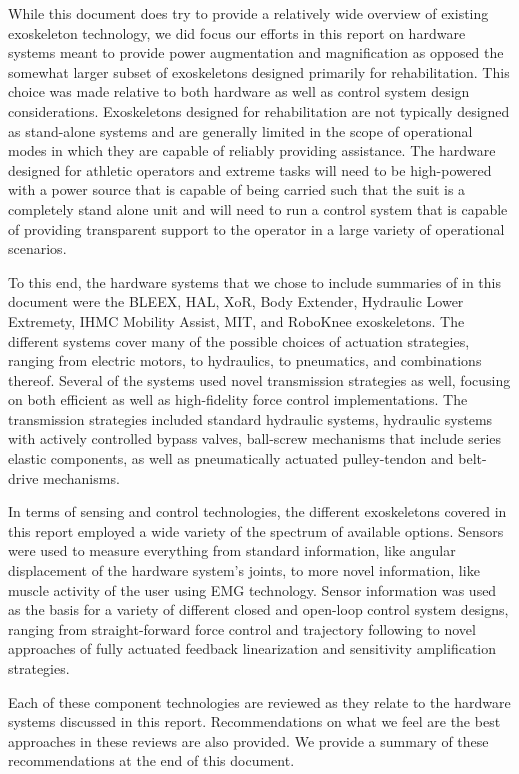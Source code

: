 \documentclass[letterpaper,12pt,fullpage]{article}
\begin{document}
While this document does try to provide a relatively wide overview of existing exoskeleton technology, we did focus our efforts in this report on hardware systems meant to provide power augmentation and magnification as opposed the somewhat larger subset of exoskeletons designed primarily for rehabilitation.  This choice was made relative to both hardware as well as control system design considerations.  Exoskeletons designed for rehabilitation are not typically designed as stand-alone systems and are generally limited in the scope of operational modes in which they are capable of reliably providing assistance.  The hardware designed for athletic operators and extreme tasks will need to be high-powered with a power source that is capable of being carried such that the suit is a completely stand alone unit and will need to run a control system that is capable of providing transparent support to the operator in a large variety of operational scenarios.

To this end, the hardware systems that we chose to include summaries of in this document were the BLEEX, HAL, XoR, Body Extender, Hydraulic Lower Extremety, IHMC Mobility Assist, MIT, and RoboKnee exoskeletons.  The different systems cover many of the possible choices of actuation strategies, ranging from electric motors, to hydraulics, to pneumatics, and combinations thereof.  Several of the systems used novel transmission strategies as well, focusing on both efficient as well as high-fidelity force control implementations.  The transmission strategies included standard hydraulic systems, hydraulic systems with actively controlled bypass valves, ball-screw mechanisms that include series elastic components, as well as pneumatically actuated pulley-tendon and belt-drive mechanisms. 

In terms of sensing and control technologies, the different exoskeletons covered in this report employed a wide variety of the spectrum of available options.  Sensors were used to measure everything from standard information, like angular displacement of the hardware system's joints, to more novel information, like muscle activity of the user using EMG technology.  Sensor information was used as the basis for a variety of different closed and open-loop control system designs, ranging from straight-forward force control and trajectory following to novel approaches of fully actuated feedback linearization and sensitivity amplification strategies.  

Each of these component technologies are reviewed as they relate to the hardware systems discussed in this report.  Recommendations on what we feel are the best approaches in these reviews are also provided.  We provide a summary of these recommendations at the end of this document.
\end{document}
